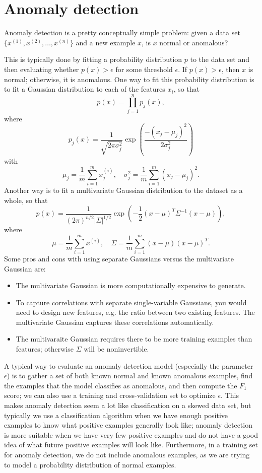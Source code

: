 \documentclass{article}
\begin{document}
\section{Anomaly detection}
Anomaly detection is a pretty conceptually simple problem: given a data set $\{x^{(1)}, x^{(2)}, \dots, x^{(n)}\}$ and a new example $x$, is $x$ normal or anomalous?

This is typically done by fitting a probability distribution $p$ to the data set and then evaluating whether $p(x) > \epsilon$ for some threshold $\epsilon$. If $p(x) > \epsilon$, then $x$ is normal; otherwise, it is anomalous. One way to fit this probability distribution is to fit a Gaussian distribution to each of the features $x_i$, so that
$$p(x) = \prod_{j=1}^n p_j(x),$$
where
$$p_j(x) = \frac{1}{\sqrt{2\pi\sigma_j^2}}\exp\left(\frac{-(x_j - \mu_j)^2}{2\sigma_j^2}\right)$$
with
$$\mu_j = \frac{1}{m} \sum_{i=1}^m x_j^{(i)}, \quad \sigma_j^2 = \frac{1}{m} \sum_{i=1}^m (x_j - \mu_j)^2.$$
Another way is to fit a multivariate Gaussian distribution to the dataset as a whole, so that
$$p(x) = \frac{1}{(2\pi)^{n/2}|\Sigma|^{1/2}}\exp\left(-\frac{1}{2}(x-\mu)^T\Sigma^{-1}(x-\mu)\right),$$
where
$$\mu = \frac{1}{m}\sum_{i=1}^m x^{(i)}, \quad \Sigma = \frac{1}{m}\sum_{i=1}^m (x-\mu)(x - \mu)^T.$$
Some pros and cons with using separate Gaussians versus the multivariate Gaussian are:
\begin{itemize}
\item The multivariate Gaussian is more computationally expensive to generate.
\item To capture correlations with separate single-variable Gaussians, you would need to design new features, e.g. the ratio between two existing features. The multivariate Gaussian captures these correlations automatically.
\item The multivaraite Gaussian requires there to be more training examples than features; otherwise $\Sigma$ will be noninvertible.
\end{itemize}

A typical way to evaluate an anomaly detection model (especially the parameter $\epsilon$) is to gather a set of both known normal and known anomalous examples, find the examples that the model classifies as anomalous, and then compute the $F_1$ score; we can also use a training and cross-validation set to optimize $\epsilon$. This makes anomaly detection seem a lot like classification on a skewed data set, but typically we use a classification algorithm when we have enough positive examples to know what positive examples generally look like; anomaly detection is more suitable when we have very few positive examples and do not have a good idea of what future positive examples will look like. Furthermore, in a training set for anomaly detection, we do not include anomalous examples, as we are trying to model a probability distribution of normal examples.
\end{document}
